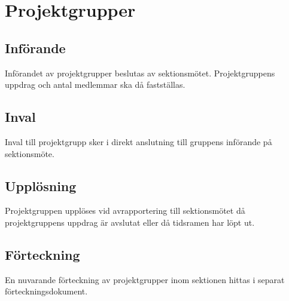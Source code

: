 \section{Projektgrupper}

\subsection{Införande}
Införandet av projektgrupper beslutas av sektionsmötet.
Projektgruppens uppdrag och antal medlemmar ska då fastställas.

\subsection{Inval}
Inval till projektgrupp sker i direkt anslutning till gruppens införande på sektionsmöte.

\subsection{Upplösning}
Projektgruppen upplöses vid avrapportering till sektionsmötet då projektgruppens
uppdrag är avslutat eller då tidsramen har löpt ut.

\subsection{Förteckning}
En nuvarande förteckning av projektgrupper inom sektionen hittas i separat förteckningsdokument.